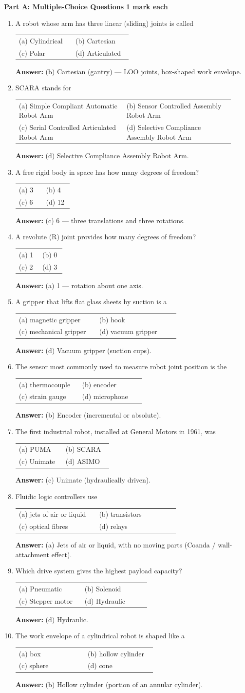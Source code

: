 \documentclass[11pt,a4paper]{article}
\makeatletter
\newcommand{\opts}[4]{%
	\par\smallskip
	\begin{tabular}{@{}p{0.46\linewidth}p{0.46\linewidth}@{}}
		(a) #1 & (b) #2 \\
		(c) #3 & (d) #4 \\
	\end{tabular}\par}
\newcommand{\ans}[1]{%
	\par\smallskip
	{\color{cGreen!50!black}\textbf{Answer:} #1}\par\medskip}
\newcommand{\partheading}[2]{%
	\bigskip
	\begin{tcolorbox}[colback=cAccent!10, colframe=cAccent, boxrule=0.6pt, arc=2pt, left=6pt, top=3pt, bottom=3pt]
		\textbf{\large #1} \hfill \textbf{#2}
	\end{tcolorbox}}
\makeatother
\begin{document}
	\partheading{Part A: Multiple-Choice Questions}{1 mark each}
	\begin{enumerate}

		\item A robot whose arm has three linear (sliding) joints is called
		\opts{Cylindrical}{Cartesian}{Polar}{Articulated}
		\ans{(b) Cartesian (gantry) --- LOO joints, box-shaped work envelope.}

		\item SCARA stands for
		\opts{Simple Compliant Automatic Robot Arm}{Sensor Controlled Assembly Robot Arm}{Serial Controlled Articulated Robot Arm}{Selective Compliance Assembly Robot Arm}
		\ans{(d) Selective Compliance Assembly Robot Arm.}

		\item A free rigid body in space has how many degrees of freedom?
		\opts{3}{4}{6}{12}
		\ans{(c) 6 --- three translations and three rotations.}

		\item A revolute (R) joint provides how many degrees of freedom?
		\opts{1}{0}{2}{3}
		\ans{(a) 1 --- rotation about one axis.}

		\item A gripper that lifts flat glass sheets by suction is a
		\opts{magnetic gripper}{hook}{mechanical gripper}{vacuum gripper}
		\ans{(d) Vacuum gripper (suction cups).}

		\item The sensor most commonly used to measure robot joint position is the
		\opts{thermocouple}{encoder}{strain gauge}{microphone}
		\ans{(b) Encoder (incremental or absolute).}

		\item The first industrial robot, installed at General Motors in 1961, was
		\opts{PUMA}{SCARA}{Unimate}{ASIMO}
		\ans{(c) Unimate (hydraulically driven).}

		\item Fluidic logic controllers use
		\opts{jets of air or liquid}{transistors}{optical fibres}{relays}
		\ans{(a) Jets of air or liquid, with no moving parts (Coanda / wall-attachment effect).}

		\item Which drive system gives the highest payload capacity?
		\opts{Pneumatic}{Solenoid}{Stepper motor}{Hydraulic}
		\ans{(d) Hydraulic.}

		\item The work envelope of a cylindrical robot is shaped like a
		\opts{box}{hollow cylinder}{sphere}{cone}
		\ans{(b) Hollow cylinder (portion of an annular cylinder).}

	\end{enumerate}
\end{document}
